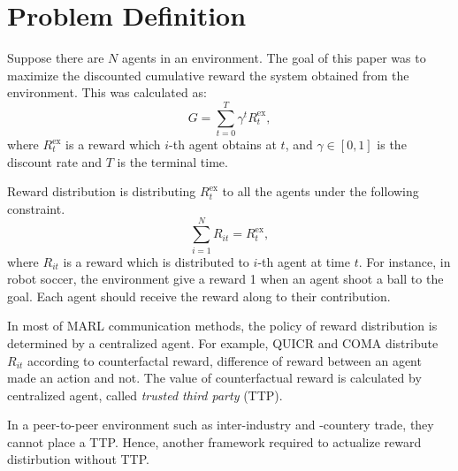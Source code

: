 \section{Problem Definition}
Suppose there are $N$ agents in an environment. 
The goal of this paper was to maximize the discounted cumulative reward the system obtained from the environment.
This was calculated as:
\begin{equation}
G = \sum_{t=0}^T \gamma^t R_{t}^\mathrm{ex},
\end{equation}
where $R_{t}^\mathrm{ex}$ is a reward which $i$-th agent obtains at $t$, 
and $\gamma \in [0, 1]$ is the discount rate and $T$ is the terminal time.

Reward distribution is distributing $R_{t}^\mathrm{ex}$ to all the agents under the following constraint.
\begin{equation}
	\sum_{i=1}^N R_{it} = R_{t}^\mathrm{ex},
	\label{eq:reward_const}
\end{equation}
where $R_{it}$ is a reward which is distributed to $i$-th agent at time $t$.
For instance, in robot soccer, the environment give a reward 1 when an agent shoot a ball to the goal.
Each agent should receive the reward along to their contribution.

In most of MARL communication methods, the policy of reward distribution is determined by a centralized agent.
For example, QUICR \citep{agogino2006quicr} and COMA \citep{foerster2017counterfactual} distribute $R_{it}$ according to counterfactal reward, difference of reward between an agent made an action and not.
The value of counterfactual reward is calculated by centralized agent, called {\em trusted third party} (TTP).

In a peer-to-peer environment such as inter-industry and -countery trade, they cannot place a TTP. 
Hence, another framework required to actualize reward distirbution without TTP.
